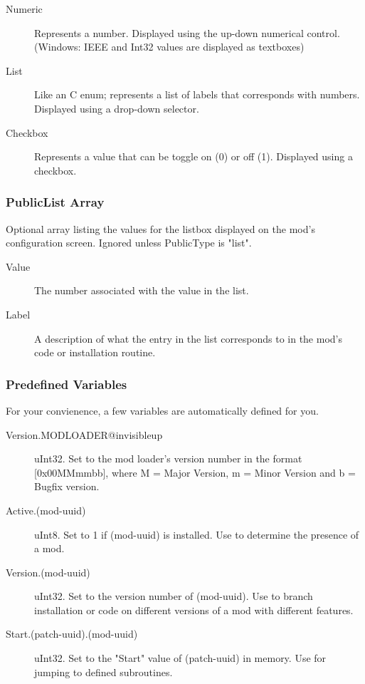 \documentclass[12pt,a4paper,notitlepage]{article}
\begin{document}
\begin{description}
\item[Numeric] Represents a number. Displayed using the up-down numerical control. (Windows: IEEE and Int32 values are displayed as textboxes)
\item[List] Like an C enum; represents a list of labels that corresponds with numbers. Displayed using a drop-down selector.
\item[Checkbox] Represents a value that can be toggle on (0) or off (1). Displayed using a checkbox.
\end{description}

\subsubsection{PublicList Array}
\label{subsubsec:create-var-listarr}
Optional array listing the values for the listbox displayed on the mod's configuration screen. Ignored unless PublicType is "list".
\begin{description}
\item[Value] The number associated with the value in the list.
\item[Label] A description of what the entry in the list corresponds to in the mod's code or installation routine.
\end{description}


\subsubsection{Predefined Variables}
\label{subsubsec:create-var-predef}
For your convienence, a few variables are automatically defined for you.

\begin{description}
\item[Version.MODLOADER@invisibleup] uInt32. Set to the mod loader's version number in the format [0x00MMmmbb], where M = Major Version, m = Minor Version and b = Bugfix version.
\item[Active.(mod-uuid)] uInt8. Set to 1 if (mod-uuid) is installed. Use to determine the presence of a mod.
\item[Version.(mod-uuid)] uInt32. Set to the version number of (mod-uuid). Use to branch installation or code on different versions of a mod with different features.
\item[Start.(patch-uuid).(mod-uuid)] uInt32. Set to the "Start" value of (patch-uuid) in memory. Use for jumping to defined subroutines.
\end{description}
\end{document}
